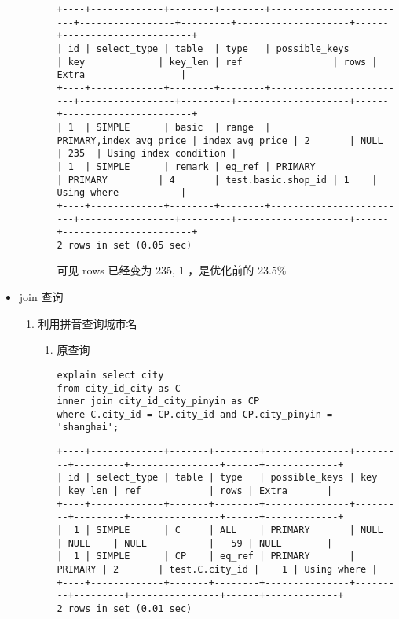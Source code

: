 \documentclass[11pt]{article}
\begin{document}
\begin{itemize}
\begin{enumerate}
\begin{enumerate}
\begin{verbatim}
+----+-------------+--------+--------+-------------------------+-----------------+---------+--------------------+------+-----------------------+
| id | select_type | table  | type   | possible_keys           | key             | key_len | ref                | rows | Extra                 |
+----+-------------+--------+--------+-------------------------+-----------------+---------+--------------------+------+-----------------------+
| 1  | SIMPLE      | basic  | range  | PRIMARY,index_avg_price | index_avg_price | 2       | NULL               | 235  | Using index condition |
| 1  | SIMPLE      | remark | eq_ref | PRIMARY                 | PRIMARY         | 4       | test.basic.shop_id | 1    | Using where           |
+----+-------------+--------+--------+-------------------------+-----------------+---------+--------------------+------+-----------------------+
2 rows in set (0.05 sec)
\end{verbatim}

可见 rows 已经变为 235, 1 ，是优化前的 23.5\%
\end{enumerate}
\end{enumerate}
\item join 查询
\label{sec-3-2-2-2}
\begin{enumerate}
\item 利用拼音查询城市名
\begin{enumerate}
\item 原查询

\begin{lstlisting}
explain select city
from city_id_city as C
inner join city_id_city_pinyin as CP
where C.city_id = CP.city_id and CP.city_pinyin = 'shanghai';
\end{lstlisting}

\begin{verbatim}
+----+-------------+-------+--------+---------------+---------+---------+----------------+------+-------------+
| id | select_type | table | type   | possible_keys | key     | key_len | ref            | rows | Extra       |
+----+-------------+-------+--------+---------------+---------+---------+----------------+------+-------------+
|  1 | SIMPLE      | C     | ALL    | PRIMARY       | NULL    | NULL    | NULL           |   59 | NULL        |
|  1 | SIMPLE      | CP    | eq_ref | PRIMARY       | PRIMARY | 2       | test.C.city_id |    1 | Using where |
+----+-------------+-------+--------+---------------+---------+---------+----------------+------+-------------+
2 rows in set (0.01 sec)
\end{verbatim}


\end{enumerate}
\end{enumerate}
\end{itemize}
\end{document}
